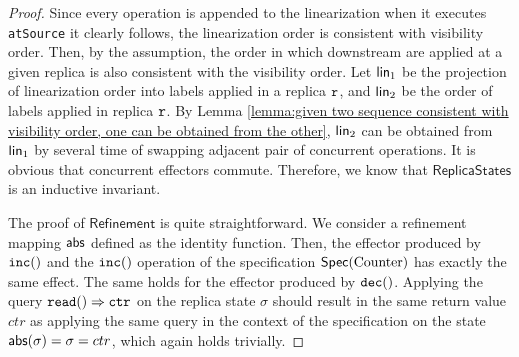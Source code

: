\begin {proof}
Since every operation is appended to the linearization when it executes {\tt atSource} it clearly follows, the linearization order is consistent with visibility order. Then, by the {} assumption, the order in which downstream are applied at a given replica is also consistent with the visibility order. Let $\alinord_1$ be the projection of linearization order into labels applied in a replica $\arep$, and $\alinord_2$ be the order of labels applied in replica $\arep$. By Lemma \ref{lemma:given two sequence consistent with visibility order, one can be obtained from the other}, $\alinord_2$ can be obtained from $\alinord_1$ by several time of swapping adjacent pair of concurrent operations. It is obvious that concurrent effectors commute. Therefore, we know that $\mathsf{ReplicaStates}$ is an inductive invariant.

The proof of $\mathsf{Refinement}$ is quite straightforward. We consider a refinement mapping $\refmap$ defined as the identity function. Then, the effector produced by $\alabelshort[{\tt inc}]{}$ and the $\alabelshort[{\tt inc}]{}$ operation of the specification $\specCounter$ has exactly the same effect. The same holds for the effector produced by $\alabelshort[{\tt dec}]{}$. Applying the query $\alabellongind[{\tt read}]{}{ctr}{}$ on the replica state $\sigma$ should result in the same return value $ctr$ as applying the same query in the context of the specification on the state $\refmap(\sigma)=\sigma=ctr$, which again holds trivially.


\end{proof}
